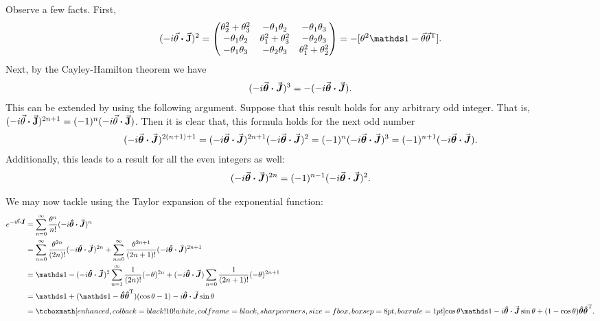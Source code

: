 Observe a few facts.
First,
\begin{eqnarray}
    \label{eq:M-sq}
    (-i \va{\theta} \vdot \va{J})^2 = 
    \begin{pmatrix}
        \theta_2^2 + \theta_3^2 & -\theta_1\theta_2 & -\theta_1\theta_3 \\
        -\theta_1\theta_2 & \theta_1^2 + \theta_3^2 & -\theta_2\theta_3 \\
        -\theta_1\theta_3 & -\theta_2\theta_3 & \theta_1^2 + \theta_2^2
    \end{pmatrix}
    = -[\theta^2\id - \va{\theta}\va{\theta}^{\rm T}]
.\end{eqnarray}
Next, by the Cayley-Hamilton theorem we have
\begin{eqnarray}
    \label{eq:M-characteristic-solve}
    (-i \va*{\theta} \vdot \va*{J})^{3} = -(-i \va*{\theta} \vdot \va*{J})
.\end{eqnarray}
This can be extended by using the following argument.
Suppose that this result holds for any arbitrary odd integer.
That is, $(-i \va{\theta} \vdot \va{J})^{2n+1} = (-1)^{n}(-i \va{\theta} \vdot \va{J})$.
Then it is clear that, this formula holds for the next odd number
\begin{eqnarray}
    \label{eq:general-odd}
    (-i \va*{\theta} \vdot \va*{J})^{2(n+1)+1} = (-i \va*{\theta} \vdot \va*{J})^{2n+1}(-i \va*{\theta} \vdot \va*{J})^2 = (-1)^{n} (-i \va*{\theta} \vdot \va*{J})^{3} = (-1)^{n+1}(-i \va*{\theta} \vdot \va*{J})
.\end{eqnarray}
Additionally, this leads to a result for all the even integers as well:
\begin{eqnarray}
    \label{eq:general-even}
    (-i \va*{\theta} \vdot \va*{J})^{2n} = (-1)^{n-1}(-i \va*{\theta} \vdot \va*{J})^2
.\end{eqnarray}

We may now tackle  using the Taylor expansion of the exponential function:
\begin{align}
    \label{eq:derive-identities}
    e^{-i \va{\theta} \vdot \va{J}} &= \sum_{n=0}^{\infty} \frac{\theta^{n}}{n!}(-i \vu*{\theta} \vdot \va*{J})^{n} \notag \\
    &= \sum_{n=0}^{\infty} \frac{\theta^{2n}}{(2n)!}(-i \vu*{\theta} \vdot \va*{J})^{2n} + \sum_{n=0}^{\infty} \frac{\theta^{2n+1}}{(2n+1)!} (-i\vu*{\theta} \vdot \va*{J})^{2n+1} \notag \\
    &= \id -(-i \vu*{\theta} \vdot \va*{J})^2\sum_{n=1}^{\infty} \frac{1}{(2n)!} (-\theta)^{2n} + (-i \vu*{\theta} \vdot \va*{J}) \sum_{n=0} \frac{1}{(2n+1)!} (-\theta)^{2n+1} \notag \\
    &= \id + (\id - \vu*{\theta}\vu*{\theta}^{\rm T})(\cos{\theta} - 1) - i \vu*{\theta} \vdot \va*{J} \sin{\theta} \notag \\
    &= \eqbox{\cos{\theta}\id - i\vu*{\theta} \vdot \va*{J} \sin{\theta} + (1-\cos{\theta})\vu*{\theta}\vu*{\theta}^{\rm T}}
.\end{align}



